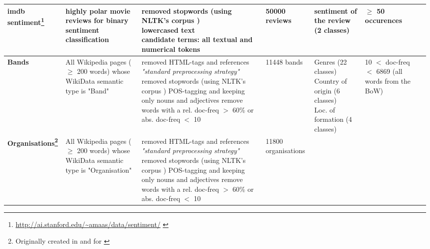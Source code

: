 \begin{landscape}
\begin{table}[]
{\begin{tabular}{@{}lllllll@{}}
				\textbf{imdb sentiment\footnote{\url{http://ai.stanford.edu/~amaas/data/sentiment/} \cite{maas-EtAl:2011:ACL-HLT2011}} \cite{Ager2018}} &
					highly polar movie reviews for binary sentiment classification  &
					\specialcell[l]{ \tabitem removed stopwords (using NLTK's corpus \cite{loper-bird-2002-nltk})\\ \tabitem lowercased text\\ \tabitem candidate terms: all textual and numerical tokens} &
					50000 reviews &
					\tabitem sentiment of the review (2 classes) &
					$\geq$ 50 occurences
					\\ \midrule
				\textbf{Bands \cite{Alshaikh2020}} &
					\specialcell[l]{All Wikipedia pages ($\geq$ 200 words) whose \\ WikiData semantic type is "Band"} &
					\specialcell[l]{ \tabitem removed HTML-tags and references \\ \tabitem \textit{"standard preprocessing strategy"} \cite[137]{Alshaikh2019} \\ \tabitem removed stopwords (using NLTK's corpus \cite{loper-bird-2002-nltk})\\ \tabitem POS-tagging and keeping only nouns and adjectives \\ \tabitem remove words with a rel. doc-freq  $>$ 60\% or abs. doc-freq $<$ 10 } &
					11448 bands & \specialcell[l]{ \tabitem Genres (22 classes) \\ \tabitem Country of origin (6 classes) \\ \tabitem Loc. of formation (4 classes) }  & 
					\specialcell[l]{ 10 $<$ doc-freq $<$ 6869 \\ (all words from the BoW)}\\ \midrule
				\textbf{Organisations\footnote{\label{fnote:for_alshaikh2019} Originally created in and for \cite{Alshaikh2019}} \cite{Alshaikh2020}} &
					\specialcell[l]{All Wikipedia pages ($\geq$ 200 words) whose \\ WikiData semantic type is "Organisation"} &
					\specialcell[l]{ \tabitem removed HTML-tags and references \\ \tabitem \textit{"standard preprocessing strategy"} \cite[137]{Alshaikh2019} \\ \tabitem removed stopwords (using NLTK's corpus \cite{loper-bird-2002-nltk})\\ \tabitem POS-tagging and keeping only nouns and adjectives \\ \tabitem remove words with a rel. doc-freq  $>$ 60\% or abs. doc-freq $<$ 10 } &
					11800 organisations &

\end{tabular}}
\end{table}
\end{landscape}
